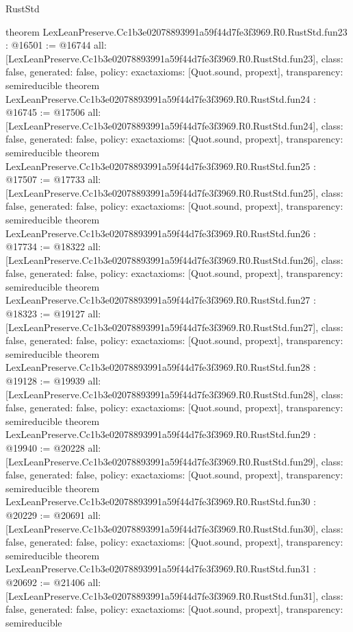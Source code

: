 \begin{lexlean}{RustStd}
\begin{coremodule}
{}
theorem LexLeanPreserve.Cc1b3e02078893991a59f44d7fe3f3969.R0.RustStd.fun23 : @16501 := @16744 {
  all: [LexLeanPreserve.Cc1b3e02078893991a59f44d7fe3f3969.R0.RustStd.fun23],
  class: false,
  generated: false,
  policy: exact{axioms: [Quot.sound, propext]},
  transparency: semireducible
}
theorem LexLeanPreserve.Cc1b3e02078893991a59f44d7fe3f3969.R0.RustStd.fun24 : @16745 := @17506 {
  all: [LexLeanPreserve.Cc1b3e02078893991a59f44d7fe3f3969.R0.RustStd.fun24],
  class: false,
  generated: false,
  policy: exact{axioms: [Quot.sound, propext]},
  transparency: semireducible
}
theorem LexLeanPreserve.Cc1b3e02078893991a59f44d7fe3f3969.R0.RustStd.fun25 : @17507 := @17733 {
  all: [LexLeanPreserve.Cc1b3e02078893991a59f44d7fe3f3969.R0.RustStd.fun25],
  class: false,
  generated: false,
  policy: exact{axioms: [Quot.sound, propext]},
  transparency: semireducible
}
theorem LexLeanPreserve.Cc1b3e02078893991a59f44d7fe3f3969.R0.RustStd.fun26 : @17734 := @18322 {
  all: [LexLeanPreserve.Cc1b3e02078893991a59f44d7fe3f3969.R0.RustStd.fun26],
  class: false,
  generated: false,
  policy: exact{axioms: [Quot.sound, propext]},
  transparency: semireducible
}
theorem LexLeanPreserve.Cc1b3e02078893991a59f44d7fe3f3969.R0.RustStd.fun27 : @18323 := @19127 {
  all: [LexLeanPreserve.Cc1b3e02078893991a59f44d7fe3f3969.R0.RustStd.fun27],
  class: false,
  generated: false,
  policy: exact{axioms: [Quot.sound, propext]},
  transparency: semireducible
}
theorem LexLeanPreserve.Cc1b3e02078893991a59f44d7fe3f3969.R0.RustStd.fun28 : @19128 := @19939 {
  all: [LexLeanPreserve.Cc1b3e02078893991a59f44d7fe3f3969.R0.RustStd.fun28],
  class: false,
  generated: false,
  policy: exact{axioms: [Quot.sound, propext]},
  transparency: semireducible
}
theorem LexLeanPreserve.Cc1b3e02078893991a59f44d7fe3f3969.R0.RustStd.fun29 : @19940 := @20228 {
  all: [LexLeanPreserve.Cc1b3e02078893991a59f44d7fe3f3969.R0.RustStd.fun29],
  class: false,
  generated: false,
  policy: exact{axioms: [Quot.sound, propext]},
  transparency: semireducible
}
theorem LexLeanPreserve.Cc1b3e02078893991a59f44d7fe3f3969.R0.RustStd.fun30 : @20229 := @20691 {
  all: [LexLeanPreserve.Cc1b3e02078893991a59f44d7fe3f3969.R0.RustStd.fun30],
  class: false,
  generated: false,
  policy: exact{axioms: [Quot.sound, propext]},
  transparency: semireducible
}
theorem LexLeanPreserve.Cc1b3e02078893991a59f44d7fe3f3969.R0.RustStd.fun31 : @20692 := @21406 {
  all: [LexLeanPreserve.Cc1b3e02078893991a59f44d7fe3f3969.R0.RustStd.fun31],
  class: false,
  generated: false,
  policy: exact{axioms: [Quot.sound, propext]},
  transparency: semireducible
}
\end{coremodule}
\end{lexlean}
